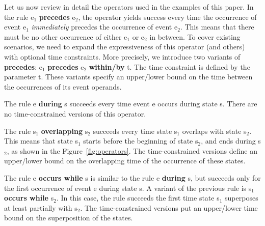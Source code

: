 

Let us now review in detail the operators used in the examples of this paper. In the rule {\ttfamily e$_1$ {\bf precedes} e$_2$}, the operator yields success every time the occurrence of event {\ttfamily e$_1$} {\em immediately} precedes the occurrence of event {\ttfamily e$_2$}. This means that there must be no other occurrence of either {\ttfamily e$_1$} or {\ttfamily e$_2$} in between. To cover existing scenarios, we need to expand the expressiveness of this operator (and others) with optional time constraints. More precisely, we introduce two variants of {\ttfamily \bf precedes}: {\ttfamily e$_1$ {\bf precedes} e$_2$ {\bf within/by} t}. The time constraint is defined by the parameter {\ttfamily t}. These variants specify an upper/lower bound on the time between the occurrences of its event operands.


The rule {\ttfamily e {\bf during} s} succeeds every time event {\ttfamily e} occurs during state {\ttfamily s}. There are no time-constrained versions of this operator.

The rule {\ttfamily s$_1$ {\bf overlapping} s$_2$} succeeds every time state {\ttfamily s$_1$} overlaps with state {\ttfamily s$_2$}.  This means that state {\ttfamily s$_1$} starts before the beginning of state {\ttfamily s$_2$}, and ends during {\ttfamily s$_2$}, as shown in the Figure~\ref{fig:operators}.  The time-constrained versions define an upper/lower bound on the overlapping time of the occurrence of these states.

The rule {\ttfamily e {\bf occurs while} s} is similar to the rule {\ttfamily e {\bf during} s}, but succeeds only for the first occurrence of event {\ttfamily e} during state {\ttfamily s}. A variant of the previous rule is {\ttfamily s$_1$ {\bf occurs while} s$_2$}. In this case, the rule succeeds the first time state {\ttfamily s$_1$} superposes at least partially with {\ttfamily s$_2$}. The time-constrained versions put an upper/lower time bound on the superposition of the states.

